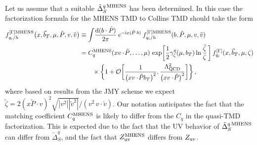 \documentclass[11pt,a4paper]{article}
\newcommand{\df}{\mathrm{d}}
\newcommand{\img}{\mathrm{i}}
\newcommand{\cO}{\mathcal{O}}
\newcommand{\nn}{\nonumber}
\newcommand{\bt}{\vec b_T}
\newcommand{\q}{q_i}
\begin{document}
Let us assume that a suitable $\tilde\Delta_S^{q\,{\rm MHENS}}$ has been determined. In this case the factorization formula for the MHENS TMD to Collins TMD should take the form 
\begin{align} \label{eq:factorization_MHENS}
 f_{\q/h}^{[\Gamma]{\rm MHENS}}\big( x, \bt, \mu, \tilde P, v,\tilde v
\big)
 &\equiv  \int\! \frac{\df(b\cdot \tilde P)}{2\pi} \: 
  e^{-\img x(\tilde P\cdot b)} \:
  f_{\q/h}^{[\Gamma]{\rm MHENS}}(b,\tilde P, \mu, v, \tilde v)
 \nn\\
 &= C_q^{\rm MHENS}(x v\cdot\! \tilde P, \ldots,\mu)\,
    \exp\biggl[ \frac12 \gamma_\zeta^q(\mu, b_T) \ln\frac{\tilde\zeta }{\zeta}\,\bigg]\,
    f_{\q}^{[\Gamma]}(x, \bt, \mu, \zeta)
\nn\\&\qquad
 \times \bigg\{ 1 + \cO\biggl[{1\over \big(x v\cdot\!\tilde P b_T \big)^2}, {\Lambda_{\rm QCD}^2\over 
  \big(x v\cdot\!\tilde P \big)^2} \biggr] \bigg\}
\,,
\end{align}
where based on results from the JMY scheme we expect $\tilde\zeta = 2( x\tilde P\cdot v)^2 \sqrt{|v^2||\tilde v^2|}/(v^2\,v\cdot\tilde v)$. Our notation anticipates the fact that the matching coefficient $C_q^{\rm MHENS}$ is likely to differ from the $C_q$ in the quasi-TMD factorization. This is expected due to the fact that the UV behavior of $\tilde \Delta_S^{q\,{\rm MHENS}}$ can differ from $\tilde \Delta_S^q$, and the fact that $Z_{\rm uv}^{\rm MHENS}$ differs from $Z_{\rm uv}$.
\end{document}
